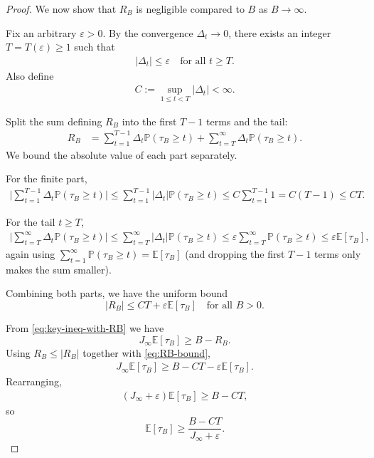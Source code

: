 \begin{proof}
We now show that $R_B$ is negligible compared to $B$ as $B\to\infty$.

Fix an arbitrary $\varepsilon>0$. By the convergence $\Delta_t\to 0$, there exists an integer $T=T(\varepsilon)\geq 1$ such that
\begin{align*}
  |\Delta_t| \leq \varepsilon
  \quad\text{for all } t\geq T.
\end{align*}
Also define
\begin{align*}
  C := \sup_{1\leq t<T} |\Delta_t| < \infty.
\end{align*}

Split the sum defining $R_B$ into the first $T-1$ terms and the tail:
\begin{align*}
  R_B
  &= \sum_{t=1}^{T-1} \Delta_t\mathbb{P}(\tau_B\geq t)
     +
     \sum_{t=T}^\infty \Delta_t\mathbb{P}(\tau_B\geq t).
\end{align*}
We bound the absolute value of each part separately.

For the finite part,
\begin{align*}
  \biggl|\sum_{t=1}^{T-1} \Delta_t\mathbb{P}(\tau_B\geq t)\biggr|
  \leq
  \sum_{t=1}^{T-1} |\Delta_t|\mathbb{P}(\tau_B\geq t)
  \leq
  C \sum_{t=1}^{T-1} 1
  = C(T-1)
  \leq C T.
\end{align*}

For the tail $t\geq T$,
\begin{align*}
  \biggl|\sum_{t=T}^\infty \Delta_t\mathbb{P}(\tau_B\geq t)\biggr|
  \leq
  \sum_{t=T}^\infty |\Delta_t|\mathbb{P}(\tau_B\geq t)
  \leq
  \varepsilon \sum_{t=T}^\infty \mathbb{P}(\tau_B\geq t)
  \leq
  \varepsilon\mathbb{E}[\tau_B],
\end{align*}
again using $\sum_{t=1}^\infty \mathbb{P}(\tau_B\geq t) = \mathbb{E}[\tau_B]$ (and dropping the first $T-1$ terms only makes the sum smaller).

Combining both parts, we have the uniform bound
\begin{equation}
  |R_B| \leq C T + \varepsilon\mathbb{E}[\tau_B]
  \quad\text{for all } B>0.
  \label{eq:RB-bound}
\end{equation}

From \eqref{eq:key-ineq-with-RB} we have
\begin{equation}
  J_\infty\mathbb{E}[\tau_B]
  \geq B - R_B.
  \label{eq:lower-step}
\end{equation}
Using $R_B \leq |R_B|$ together with \eqref{eq:RB-bound},
\begin{align*}
  J_\infty\mathbb{E}[\tau_B]
  \geq B - C T - \varepsilon\mathbb{E}[\tau_B].
\end{align*}
Rearranging,
\begin{align*}
  (J_\infty + \varepsilon)\mathbb{E}[\tau_B]
  \geq B - C T,
\end{align*}
so
\begin{equation}
  \mathbb{E}[\tau_B]
  \geq
  \frac{B - C T}{J_\infty + \varepsilon}.
  \label{eq:tau-lower-bound}
\end{equation}


\end{proof}
